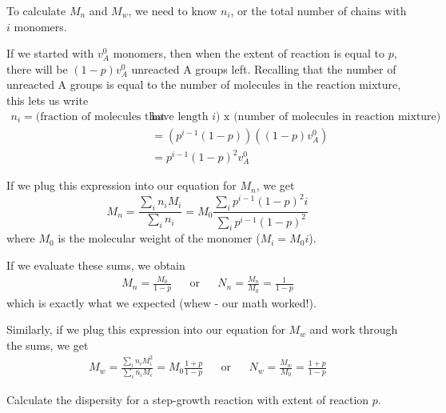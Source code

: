 \begin{activity}
\begin{ctqs}
\end{ctqs}


\begin{model}

	To calculate $M_n$ and $M_w$, we need to know $n_i$, or the total number of chains with $i$ monomers.
	
	If we started with $v_A^0$ monomers, then when the extent of reaction is equal to $p$, there will be $(1-p)v_A^0$ unreacted A groups left.  Recalling that the number of unreacted A groups is equal to the number of molecules in the reaction mixture, this lets us write
	\begin{align*}
		n_i = \text{(fraction of molecules that }&\text{have length }i\text{) x (number of molecules in reaction mixture)}\\
			&= \left(p^{i-1}(1-p)\right)\left((1-p)v_A^0\right)\\
			&= p^{i-1}(1-p)^2v_A^0
	\end{align*}
	
	If we plug this expression into our equation for $M_n$, we get
	\begin{equation*}
		M_n = \frac{\sum_i n_i M_i}{\sum_i n_i} %
		= M_0\frac{\sum_i p^{i-1}(1-p)^2 i }{\sum_i p^{i-1}(1-p)^2}
	\end{equation*}
	where $M_0$ is the molecular weight of the monomer ($M_i = M_0 i$).
	
	\vspace{0.25in}
	
	If we evaluate these sums, we obtain
	\begin{align*}
		M_n = \frac{M_0}{1-p} && \text{or} && N_n = \frac{M_n}{M_0} = \frac{1}{1-p}
	\end{align*}
	which is exactly what we expected (whew - our math worked!).
	
	\vspace{0.25in}
	Similarly, if we plug this expression into our equation for $M_w$ and work through the sums, we get
	\begin{align*}
		M_w = \frac{\sum_i n_i M_i^2}{\sum_i n_i M_i} = M_0\frac{1+p}{1-p} && \text{or} && N_w = \frac{M_w}{M_0} = \frac{1+p}{1-p}
	\end{align*}

\end{model}

\begin{ctqs}
		\question Calculate the dispersity for a step-growth reaction with extent of reaction $p$.
		

\end{ctqs}
\end{activity}
